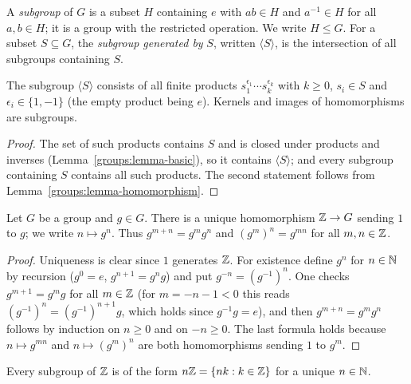 \begin{definition}\label{groups:definition-subgroup}
A \emph{subgroup} of $G$ is a subset $H$ containing $e$ with $ab \in H$ and
$a^{-1} \in H$ for all $a, b \in H$; it is a group with the restricted operation.
We write $H \leq G$. For a subset $S \subseteq G$, the \emph{subgroup generated by}
$S$, written $\langle S \rangle$, is the intersection of all subgroups containing $S$.
\end{definition}

\begin{lemma}\label{groups:lemma-generated-subgroup}
The subgroup $\langle S \rangle$ consists of all finite products
$s_1^{\epsilon_1} \cdots s_k^{\epsilon_k}$ with $k \geq 0$, $s_i \in S$ and
$\epsilon_i \in \{1, -1\}$ (the empty product being $e$). Kernels and images of
homomorphisms are subgroups.
\end{lemma}

\begin{proof}
The set of such products contains $S$ and is closed under products and
inverses (Lemma~\ref{groups:lemma-basic}), so it contains $\langle S \rangle$; and
every subgroup containing $S$ contains all such products. The second statement
follows from Lemma~\ref{groups:lemma-homomorphism}.
\end{proof}

\begin{lemma}\label{groups:lemma-powers}
Let $G$ be a group and $g \in G$. There is a unique homomorphism
$\mathbb{Z} \to G$ sending $1$ to $g$; we write $n \mapsto g^n$. Thus
$g^{m+n} = g^m g^n$ and $(g^m)^n = g^{mn}$ for all $m, n \in \mathbb{Z}$.
\end{lemma}

\begin{proof}
Uniqueness is clear since $1$ generates $\mathbb{Z}$. For existence define $g^n$ for
$n \in \mathbb{N}$ by recursion ($g^0 = e$, $g^{n+1} = g^n g$) and put
$g^{-n} = (g^{-1})^n$. One checks $g^{m+1} = g^m g$ for all $m \in \mathbb{Z}$ (for
$m = -n - 1 < 0$ this reads $(g^{-1})^{n} = (g^{-1})^{n+1} g$, which holds since
$g^{-1}g = e$), and then $g^{m+n} = g^m g^n$ follows by induction on $n \geq 0$ and
on $-n \geq 0$. The last formula holds because $n \mapsto g^{mn}$ and
$n \mapsto (g^m)^n$ are both homomorphisms sending $1$ to $g^m$.
\end{proof}

\begin{proposition}\label{groups:proposition-subgroups-integers}
Every subgroup of $\mathbb{Z}$ is of the form $n\mathbb{Z} = \{nk : k \in \mathbb{Z}\}$ for a unique
$n \in \mathbb{N}$.
\end{proposition}

